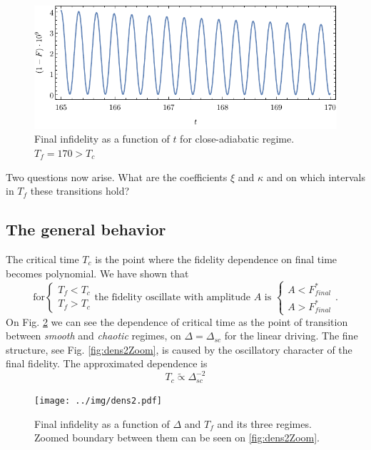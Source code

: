 \begin{figure}[H]
    \centering
    \includegraphics[scale=1.2]{../img/overcritical.pdf}
    \caption{Final infidelity as a function of $t$ for close-adiabatic regime. $T_f=170>T_c$}
    \label{fig:overcritical}
\end{figure}

Two questions now arise. What are the coefficients $\xi$ and $\kappa$ and on which intervals in $T_f$ these transitions hold? 

\subsection{The general behavior}
The critical time $T_c$ is the point where the fidelity dependence on final time becomes polynomial. We have shown that 
\begin{equation}
    \text{for}\begin{cases}
        T_f<T_c \\
        T_f>T_c 
    \end{cases}\text{the fidelity oscillate with amplitude } A \text{ is }
    \begin{cases}
        A<F^*_{final}\\
        A>F^*_{final}
    \end{cases}.
\end{equation}
On Fig. \ref{fig:dens2} we can see the dependence of critical time as the point of transition between \emph{smooth} and \emph{chaotic} regimes, on $\Delta=\Delta_{sc}$ for the linear driving. The fine structure, see Fig. \ref{fig:dens2Zoom}, is caused by the oscillatory character of the final fidelity. The approximated dependence is
\begin{equation}
    T_c\tilde\propto \Delta_{sc}^{-2}
\end{equation}


\begin{figure}[H]
    \centering 
    \texttt{[image: ../img/dens2.pdf]}
    \caption{Final infidelity as a function of $\Delta$ and $T_f$ and its three regimes. Zoomed boundary between them can be seen on \ref{fig:dens2Zoom}.}
    \label{fig:dens2}
\end{figure}

